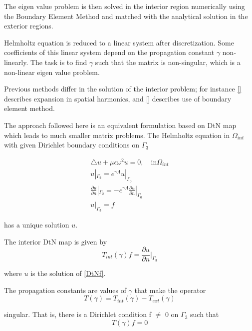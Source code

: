  The eigen value problem is then solved in the interior region
numerically using the Boundary Element Method and matched with the
analytical solution in the exterior regions.

Helmholtz equation is reduced to a linear system after
discretization. Some coefficients of this linear system depend on the
propagation constant $\gamma$ non-linearly. The task is to find
$\gamma$ such that the matrix is non-singular, which is a non-linear
eigen value problem.

Previous methods differ in the solution of the interior problem; for
instance \ref{} describes expansion in spatial harmonics, and \ref{}
describes use of boundary element method.

The approach followed here is an equivalent formulation based on DtN
map which leads to much smaller matrix problems. The Helmholtz
equation in $\Omega_{int}$ with given Dirichlet boundary conditions on
$\Gamma_3$

\begin{equation}
\begin{array}{ll}
\triangle u + \mu \epsilon \omega^2 u = 0, \quad \textrm{in}
\Omega_{int} \\
u|_{\Gamma_2} = e^{\gamma \Lambda} u|_{\Gamma_0} \\
\frac{\partial u}{\partial n} |_{\Gamma_2} = -e^{\gamma \Lambda}
 \frac{\partial u}{\partial n} |_{\Gamma_0} \\
u|_{\Gamma_3} = f
\end{array}
\label{DtNf}
\end{equation} 

has a unique solution $u$.

The interior DtN map is given by
\begin{equation}
  T_{int}(\gamma) f = \frac{\partial u}{\partial n} |_{\Gamma_3}
\end{equation} 

where $u$ is the solution of \ref{DtNf}.

The propagation constants are values of $\gamma$ that make the operator
\begin{equation}
T(\gamma) = T_{int}(\gamma) - T_{ext}(\gamma)
\label{eqTdiff}
\end{equation} 

singular. That is, there is a Dirichlet condition f $\neq$ 0 on
$\Gamma_3$ such that
\begin{equation}
T(\gamma) f = 0
\label{eqTf}
\end{equation}

